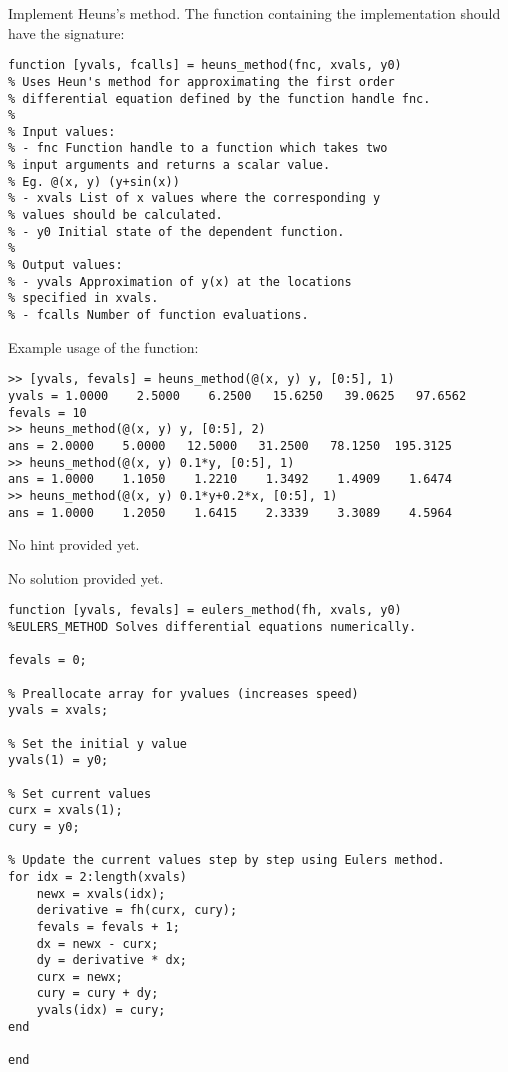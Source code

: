 \begin{ex}%
Implement Heuns's method.
The function containing the implementation should
have the signature:
\begin{lstlisting}
function [yvals, fcalls] = heuns_method(fnc, xvals, y0)
% Uses Heun's method for approximating the first order
% differential equation defined by the function handle fnc.
%
% Input values:
% - fnc Function handle to a function which takes two
% input arguments and returns a scalar value.
% Eg. @(x, y) (y+sin(x))
% - xvals List of x values where the corresponding y
% values should be calculated.
% - y0 Initial state of the dependent function.
%
% Output values:
% - yvals Approximation of y(x) at the locations
% specified in xvals.
% - fcalls Number of function evaluations.
\end{lstlisting}
Example usage of the function:
\begin{lstlisting}
>> [yvals, fevals] = heuns_method(@(x, y) y, [0:5], 1)
yvals = 1.0000    2.5000    6.2500   15.6250   39.0625   97.6562
fevals = 10
>> heuns_method(@(x, y) y, [0:5], 2)
ans = 2.0000    5.0000   12.5000   31.2500   78.1250  195.3125
>> heuns_method(@(x, y) 0.1*y, [0:5], 1)
ans = 1.0000    1.1050    1.2210    1.3492    1.4909    1.6474
>> heuns_method(@(x, y) 0.1*y+0.2*x, [0:5], 1)
ans = 1.0000    1.2050    1.6415    2.3339    3.3089    4.5964
\end{lstlisting}
\begin{hint}
No hint provided yet.
\end{hint}
\begin{sol}
No solution provided yet.
\begin{lstlisting}
function [yvals, fevals] = eulers_method(fh, xvals, y0)
%EULERS_METHOD Solves differential equations numerically.

fevals = 0;

% Preallocate array for yvalues (increases speed)
yvals = xvals;

% Set the initial y value
yvals(1) = y0;

% Set current values
curx = xvals(1);
cury = y0;

% Update the current values step by step using Eulers method.
for idx = 2:length(xvals)
    newx = xvals(idx);
    derivative = fh(curx, cury);
    fevals = fevals + 1;
    dx = newx - curx;
    dy = derivative * dx;
    curx = newx;
    cury = cury + dy;
    yvals(idx) = cury;
end

end
\end{lstlisting}
\end{sol}
\end{ex}
 
